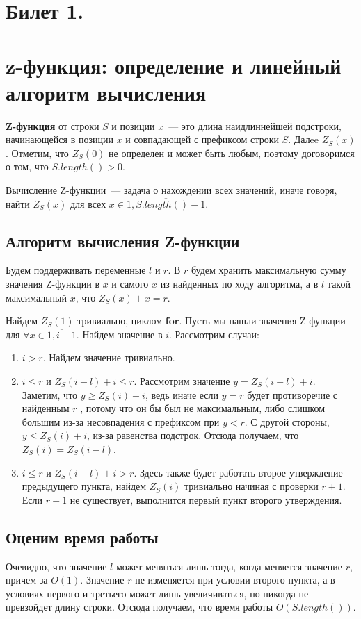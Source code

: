\section{Билет 1.}
\section*{z-функция: определение и линейный алгоритм вычисления}
\par
\textbf{Z-функция} от строки $S$ и позиции $x$~--- это длина наидлиннейшей подстроки,
начинающейся в позиции $x$ и совпадающей с префиксом строки $S$. Далee $Z_S(x)$.
Отметим, что $Z_S(0)$ не определен и может быть любым, поэтому договоримся о том, что
$S.length() > 0$.

\par
Вычисление Z-функции~--- задача о нахождении всех значений, иначе говоря, найти
$Z_S(x)$ для всех $x \in \overline{1, S.length() - 1}$.

\subsection*{Алгоритм вычисления Z-функции}

Будем поддерживать переменные $l$ и $r$.
В $r$ будем хранить максимальную сумму значения Z-функции в $x$ и самого $x$ из найденных по ходу алгоритма,
а в $l$ такой максимальный $x$, что $Z_S(x) + x = r$.

\par
Найдем $Z_S(1)$ тривиально, циклом \textbf{for}. Пусть мы нашли значения Z-функции
для $\forall x \in \overline{1, i - 1}$. Найдем значение в $i$. Рассмотрим случаи:

\begin{enumerate}
    \item $i > r$.
Найдем значение тривиально.
    \item $i \leq  r$ и $Z_S(i - l) + i \leq r$. Рассмотрим значение $y = Z_S(i - l) + i$.
Заметим, что $y \geq  Z_S(i) + i$, ведь иначе если $y = r$ будет противоречие с найденным $r$ , потому что он бы был не максимальным,
либо слишком большим из-за несовпадения с префиксом при $y < r$. С другой стороны, $y \leq Z_S(i) + i$, из-за равенства подстрок.
Отсюда получаем, что $Z_S(i) = Z_S(i - l)$.
    \item $i \leq r$ и $Z_S(i - l) + i > r$. Здесь также будет работать второе утверждение предыдущего пункта, 
    найдем $Z_S(i)$ тривиально начиная с проверки $r+1$. Если $r+1$ не существует, выполнится первый пункт второго утверждения.
\end{enumerate}

\subsection*{Оценим время работы}
\par
Очевидно, что значение $l$ может меняться лишь тогда, когда меняется значение $r$, причем за $O(1)$.
Значение $r$ не изменяется при условии второго пункта, а в условиях первого и третьего может лишь увеличиваться,
но никогда не превзойдет длину строки. Отсюда получаем, что время работы $O(S.length())$.